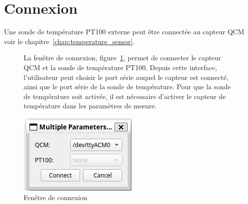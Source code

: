 \section{Connexion}
Une sonde de température PT100 externe peut être connectée au capteur QCM voir le chapitre~\ref{chap:temperature_sensor}.
\begin{figure}[H]
    \begin{minipage}{0.64\textwidth}
        La fenêtre de connexion, figure~\ref{fig:connection window}, permet de connecter le capteur QCM et la sonde de température PT100.
        Depuis cette interface, l'utilisateur peut choisir le port série auquel le capteur est connecté, ainsi que le port série de la sonde de température.
        Pour que la sonde de température soit activée, il est nécessaire d'activer le capteur de température dans les paramètres de mesure.
    \end{minipage}\hfill
    \begin{minipage}{0.30\textwidth}
        \centering
        \includegraphics[width=\textwidth]{assets/figures/ConnectionDialogue.png}
        \caption{Fenêtre de connexion}
        \label{fig:connection window}
    \end{minipage}
\end{figure}

